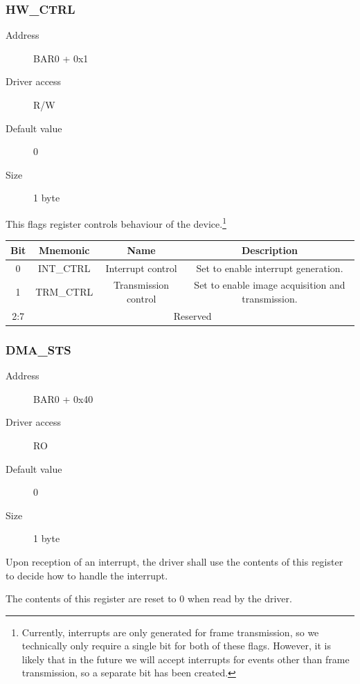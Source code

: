 \documentclass[12pt]{article}
\begin{document}
\subsubsection{HW\_CTRL}

\begin{description}
\item[Address] BAR0 + 0x1
\item[Driver access] R/W
\item[Default value] 0
\item[Size] 1 byte
\end{description}

This flags register controls behaviour of the device.\footnote{Currently, interrupts are only generated for frame transmission, so we technically only require a single bit for both of these flags. However, it is likely that in the future we will accept interrupts for events other than frame transmission, so a separate bit has been created.}

\begin{tabular}{|c|c|c|c|}\hline
\textbf{Bit} & \textbf{Mnemonic} & \textbf{Name} & \textbf{Description} \\ \hline
0 & INT\_CTRL & Interrupt control & Set to enable interrupt generation. \\ \hline
1 & TRM\_CTRL & Transmission control & Set to enable image acquisition and transmission. \\ \hline
2:7 & \multicolumn{3}{|c|}{Reserved} \\ \hline
\end{tabular}

\subsubsection{DMA\_STS}

\begin{description}
\item[Address] BAR0 + 0x40
\item[Driver access] RO
\item[Default value] 0
\item[Size] 1 byte
\end{description}

Upon reception of an interrupt, the driver shall use the contents of this register to decide how to handle the interrupt.

The contents of this register are reset to 0 when read by the driver.
\end{document}
